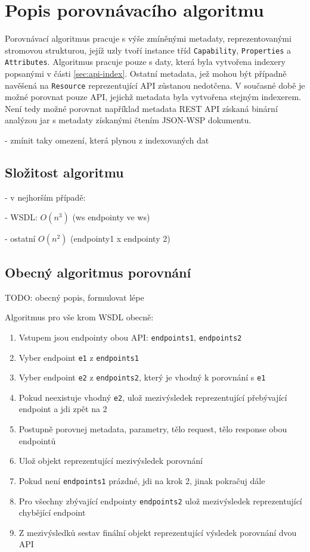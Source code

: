 \documentclass[czech,DP]{thesiskiv}
\begin{document}
\section{Popis porovnávacího algoritmu}

Porovnávací algoritmus pracuje s výše zmíněnými metadaty, reprezentovanými stromovou strukturou, jejíž uzly tvoří instance tříd \verb|Capability|, \verb|Properties| a \verb|Attributes|. Algoritmus pracuje pouze s daty, která byla vytvořena indexery popsanými v části \ref{sec:api-index}. Ostatní metadata, jež mohou být případně navěšená na \verb|Resource| reprezentující API zůstanou nedotčena. V současné době je možné porovnat pouze API, jejichž metadata byla vytvořena stejným indexerem. Není tedy možné porovnat například metadata REST API získaná binární analýzou jar s metadaty získanými čtením JSON-WSP dokumentu.

- zmínit taky omezení, která plynou z indexovaných dat

\subsection{Složitost algoritmu}

- v nejhorším případě:

	- WSDL: $O(n^3)$ (ws endpointy ve ws)
	
	- ostatní $O(n^2)$ (endpointy1 x endpointy 2)

\subsection{Obecný algoritmus porovnání}

TODO: obecný popis, formulovat lépe

Algoritmus pro vše krom WSDL obecně:
\begin{enumerate}
	\item Vstupem jsou endpointy obou API: \verb|endpoints1|, \verb|endpoints2|
	\item Vyber endpoint \verb|e1| z \verb|endpoints1|
	\item Vyber endpoint \verb|e2| z \verb|endpoints2|, který je vhodný k porovnání s \verb|e1|
	\item Pokud neexistuje vhodný \verb|e2|, ulož mezivýsledek reprezentující přebývající endpoint a jdi zpět na 2
	\item Postupně porovnej metadata, parametry, tělo request, tělo response obou endpointů
	\item Ulož objekt reprezentující mezivýsledek porovnání
	\item Pokud není \verb|endpoints1| prázdné, jdi na krok 2, jinak pokračuj dále
	\item Pro všechny zbývající endpointy \verb|endpoints2| ulož mezivýsledek reprezentující chybějící endpoint
	\item Z mezivýsledků sestav finální objekt reprezentující výsledek porovnání dvou API
\end{enumerate}
\end{document}
